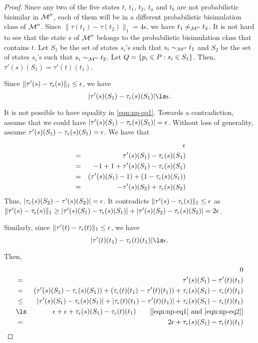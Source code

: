 \begin{proof}
	Since any two of the five states $t$, $t_1$, $t_2$, $t_a$ and $t_b$ are not probabilistic bisimilar in $\mathcal{M}''$, each of them will be in a different probabilistic bisimulation class of $\mathcal{M}''$. Since $\|\tau(t_1) - \tau(t_2)\|_1 = 4\epsilon$, we have $t_1 \not\sim_{\mathcal{M}''} t_2$. It is not hard to see that the state $s$ of $\mathcal{M}''$ belongs to the probabilistic bisimulation class that contains $t$. Let $S_1$ be the set of states $s_i$'s such that $s_i \sim_{\mathcal{M}''} t_1$ and $S_2$ be the set of states $s_i$'s such that $s_i \sim_{\mathcal{M}''} t_2$. Let $Q = \{p_i \in P : s_i \in S_1 \}$. Then, $\tau'(s)(S_1) = \tau'(t)(t_1)$.
	
	Since $\|\tau'(s) - \tau_{\epsilon}(s)\|_1 \le \epsilon$, we have \begin{equation}
	\label{eqn:np-eq1}
	|\tau'(s)(S_1) -\tauHyp(s)(S_1)| \ls \epsilon.
	\end{equation}
	
	It is not possible to have equality in \eqref{eqn:np-eq1}. Towards a contradiction, assume that we could have $|\tau'(s)(S_1) -\tau_{\epsilon}(s)(S_1)| = \epsilon$. Without loss of generality, assume $\tau'(s)(S_1) -\tau_{\epsilon}(s)(S_1) = \epsilon$. We have that 
	\begin{eqnarray*}
		&& \epsilon\\		
		&=& \tau'(s)(S_1) -\tau_{\epsilon}(s)(S_1) \\
		&=& -1 + 1+ \tau'(s)(S_1) -\tau_{\epsilon}(s)(S_1) \\
		&=& (\tau'(s)(S_1) -1) + (1-\tau_{\epsilon}(s)(S_1)) \\
		&=& -\tau'(s)(S_2) + \tau_{\epsilon}(s)(S_2) 
	\end{eqnarray*}
	Thus,  $|\tau_{\epsilon}(s)(S_2)  -\tau'(s)(S_2)| = \epsilon$.  It contradicts $\|\tau'(s) -\tau_{\epsilon}(s)\|_1 \le \epsilon$ as $\|\tau'(s) -\tau_{\epsilon}(s)\|_1 \ge |\tau'(s) (S_1)-\tau_{\epsilon}(s)(S_1)| + |\tau'(s) (S_2)-\tau_{\epsilon}(s)(S_2)| = 2\epsilon$. 
	
	Similarly, since $\|\tau'(t) - \tau_{\epsilon}(t)\|_1 \le \epsilon$, we have 
	\begin{equation}
	\label{eqn:np-eq2}
	|\tau'(t)(t_1) - \tauHyp(t)(t_1)| \ls \epsilon.
	\end{equation}
	
	
	Then,
	\begin{eqnarray*}
		&&0\\
		&=&	 \tau'(s)(S_1) - \tau'(t)(t_1) \\
		&=&(\tau'(s)(S_1)- \tauHyp(s)(S_1)) +(\tauHyp(t)(t_1) - \tau'(t)(t_1)) +\tauHyp(s)(S_1) - \tauHyp(t)(t_1) \\
		&\le&| \tau'(s)(S_1)-  \tauHyp(s)(S_1)| +|\tauHyp(t)(t_1) - \tau'(t)(t_1)| + \tauHyp(s)(S_1) - \tauHyp(t)(t_1) \\
		&\ls& \epsilon + \epsilon + \tauHyp(s)(S_1) - \tauHyp(t)(t_1) \commenteq{\eqref{eqn:np-eq1} and \eqref{eqn:np-eq2}}\\
		&=&2\epsilon + \tauHyp(s)(S_1) - \tauHyp(t)(t_1) 
	\end{eqnarray*}
	

\end{proof}
